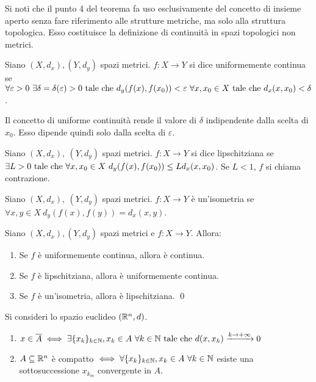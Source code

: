 \begin{remark}
    Si noti che il punto 4 del teorema fa uso esclusivamente del concetto di insieme aperto senza fare riferimento alle strutture metriche, ma solo alla struttura topologica. Esso costituisce la definizione di continuità in spazi topologici non metrici.
\end{remark}

\begin{definition}
    Siano $(X, d_x), (Y, d_y)$ spazi metrici. $f : X \to Y$ si dice uniformemente continua se $\forall \varepsilon > 0 \ \exists \delta = \delta (\varepsilon) > 0 \text{ tale che } d_y(f(x), f(x_0)) < \varepsilon \ \forall x,x_0 \in X \text{ tale che } d_x(x, x_0) < \delta$.
\end{definition}

\begin{remark}
    Il concetto di uniforme continuità rende il valore di $\delta$ indipendente dalla scelta di $x_0$. Esso dipende quindi solo dalla scelta di $\varepsilon$.
\end{remark}

\begin{definition}
    Siano $(X, d_x),\ (Y, d_y)$ spazi metrici. $f: X \to Y$ si dice lipschitziana se $\exists L > 0 \text{ tale che } \forall x, x_0 \in X \ d_y(f(x), f(x_0)) \leq Ld_x(x, x_0)$. Se $L<1$, $f$ si chiama contrazione.
\end{definition}

\begin{definition}
    [Isometria]
    Siano $(X, d_x),\ (Y, d_y)$ spazi metrici. $f: X \to Y$ è un'isometria se $\forall x, y \in X \ d_y(f(x), f(y)) = d_x(x,y)$.
\end{definition}

\begin{theorem}
    Siano $(X, d_x), (Y, d_y)$ spazi metrici e $f:X \to Y$. Allora:
    \begin{enumerate}
        \item Se $f$ è uniformemente continua, allora è continua.
        \item Se $f$ è lipschitziana, allora è uniformemente continua.
        \item Se $f$ è un'isometria, allora è lipschitziana.
        \qed
    \end{enumerate}
\end{theorem}

\begin{prop}
    Si consideri lo spazio euclideo $(\mathbb{R}^n,d)$.
    \begin{enumerate}
        \item $x \in \overline{A} \iff \exists \{x_k\}_{k\in \mathbb{N}}, x_k \in A \ \forall k \in \mathbb{N} \text{ tale che } d(x, x_k) \xrightarrow{k \to + \infty} 0$

        \item $A \subseteq \mathbb{R}^n$ è compatto $\iff \forall\{x_k\}_{k\in \N}, x_k \in A \ \forall k \in \N$ esiste una sottosuccessione $x_{k_m}$ convergente in $A$.
    \end{enumerate}
\end{prop}


